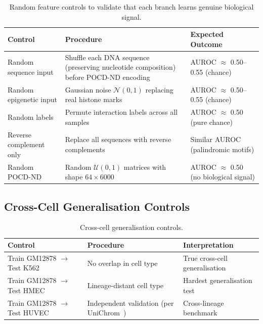 \documentclass[11pt,a4paper]{article}
\begin{document}
\begin{table}[H]
\centering
\begin{tabular}{L{4cm}L{5cm}L{4cm}}
\toprule
\textbf{Control} & \textbf{Procedure} & \textbf{Expected Outcome} \\
\midrule
{}
Random sequence input & Shuffle each DNA sequence (preserving nucleotide composition) before POCD-ND encoding & AUROC $\approx$ 0.50--0.55 (chance) \\
Random epigenetic input & Gaussian noise $\mathcal{N}(0,1)$ replacing real histone marks & AUROC $\approx$ 0.50--0.55 (chance) \\
Random labels & Permute interaction labels across all samples & AUROC $\approx$ 0.50 (pure chance) \\
Reverse complement only & Replace all sequences with reverse complements & Similar AUROC (palindromic motifs) \\
Random POCD-ND & Random $\mathcal{U}(0,1)$ matrices with shape $64 \times 6000$ & AUROC $\approx$ 0.50 (no biological signal) \\
\bottomrule
\end{tabular}
\caption{Random feature controls to validate that each branch learns genuine biological signal.}
\end{table}

\subsection{Cross-Cell Generalisation Controls}

\begin{table}[H]
\centering
\begin{tabular}{L{4cm}L{5cm}L{4cm}}
\toprule
\textbf{Control} & \textbf{Procedure} & \textbf{Interpretation} \\
\midrule
{}
Train GM12878 $\rightarrow$ Test K562 & No overlap in cell type & True cross-cell generalisation \\
Train GM12878 $\rightarrow$ Test HMEC & Lineage-distant cell type & Hardest generalisation test \\
Train GM12878 $\rightarrow$ Test HUVEC & Independent validation (per UniChrom~\cite{unichrom}) & Cross-lineage benchmark \\
\bottomrule
\end{tabular}
\caption{Cross-cell generalisation controls.}
\end{table}
\end{document}
